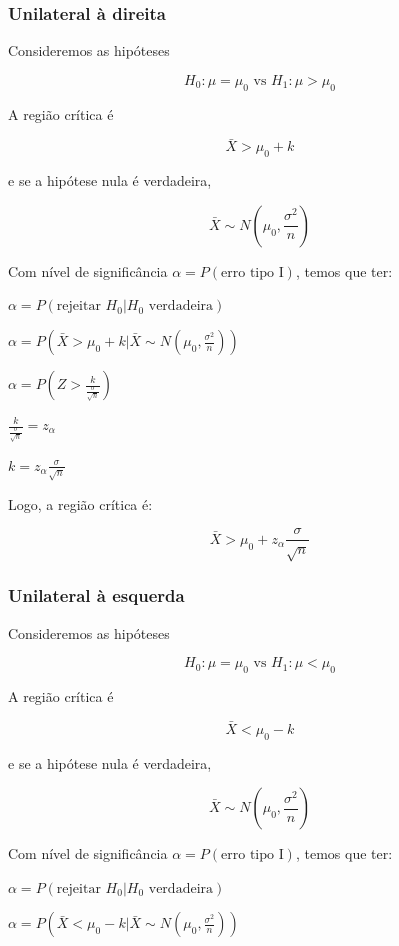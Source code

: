 \documentclass[
]{book}
\begin{document}
\hypertarget{unilateral-uxe0-direita}{%
\subsubsection{Unilateral à direita}\label{unilateral-uxe0-direita}}

Consideremos as hipóteses

\[H_0:\mu=\mu_0 \text{  vs  } H_1:\mu>\mu_0\]

A região crítica é

\[\bar X > \mu_0+k\]

e se a hipótese nula é verdadeira,

\[\bar X \sim N\left(\mu_0,\frac{\sigma^2}{n}\right)\]

Com nível de significância \(\alpha=P(\text{erro tipo I})\), temos que ter:

\(\alpha=P\left(\text{rejeitar }H_0|H_0\text{ verdadeira}\right)\)

\(\alpha=P\left(\bar X > \mu_0+k|\bar X \sim N\left(\mu_0,\frac{\sigma^2}{n}\right)\right)\)

\(\alpha=P\left(Z>\frac{k}{\frac{\sigma}{\sqrt n}}\right)\)

\(\frac{k}{\frac{\sigma}{\sqrt n}}=z_{\alpha}\)

\(k = z_{\alpha}\frac{\sigma}{\sqrt n}\)

Logo, a região crítica é:

\[\bar X > \mu_0+z_{\alpha}\frac{\sigma}{\sqrt n}\]

\hypertarget{unilateral-uxe0-esquerda}{%
\subsubsection{Unilateral à esquerda}\label{unilateral-uxe0-esquerda}}

Consideremos as hipóteses

\[H_0:\mu=\mu_0 \text{  vs  } H_1:\mu<\mu_0\]

A região crítica é

\[\bar X < \mu_0-k\]

e se a hipótese nula é verdadeira,

\[\bar X \sim N\left(\mu_0,\frac{\sigma^2}{n}\right)\]

Com nível de significância \(\alpha=P(\text{erro tipo I})\), temos que ter:

\(\alpha=P\left(\text{rejeitar }H_0|H_0\text{ verdadeira}\right)\)

\(\alpha=P\left(\bar X < \mu_0-k|\bar X \sim N\left(\mu_0,\frac{\sigma^2}{n}\right)\right)\)
\end{document}
